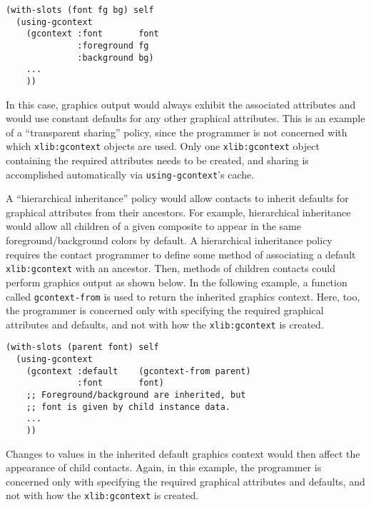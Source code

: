 \documentclass[twoside]{book}
\begin{document}
\begin{sloppy}
{\samepage
\begin{center}
\begin{verbatim}
(with-slots (font fg bg) self
  (using-gcontext
    (gcontext :font       font
              :foreground fg
              :background bg)
    ...
    ))
\end{verbatim}

\end{center}}

In this case, graphics output would always exhibit the associated
attributes and would use constant defaults for any other graphical
attributes.
This is an example of a ``transparent sharing'' policy, since the
programmer is not concerned with which {\tt xlib:gcontext} objects are
used. Only one {\tt xlib:gcontext} object containing the required
attributes needs to be created, and sharing is accomplished
automatically via {\tt using-gcontext}'s cache.


A ``hierarchical inheritance'' policy would allow contacts to inherit
defaults for graphical attributes from their ancestors. For example,
hierarchical inheritance would allow all children of a given composite
to appear in the same foreground/background colors by default. A
hierarchical inheritance policy requires the contact programmer to
define some
method of associating a default {\tt xlib:gcontext} with an ancestor.
Then, methods of children contacts could perform graphics output
as shown below. In the following example, a function called {\tt gcontext-from}
is used to return the inherited graphics context. Here, too, the
programmer is concerned only
with specifying the required graphical attributes and defaults, and not
with how the {\tt xlib:gcontext} is created.

\pagebreak
{\samepage
\begin{center}
\begin{verbatim}
(with-slots (parent font) self
  (using-gcontext
    (gcontext :default    (gcontext-from parent) 
              :font       font)
    ;; Foreground/background are inherited, but
    ;; font is given by child instance data.
    ...
    ))
\end{verbatim}

\end{center}}

Changes to values in the inherited default graphics context would then
affect the appearance of child contacts.
Again, in this example, the
programmer is concerned only
with specifying the required graphical attributes and defaults, and not
with how the {\tt xlib:gcontext} is created.


\end{sloppy}
\end{document}
